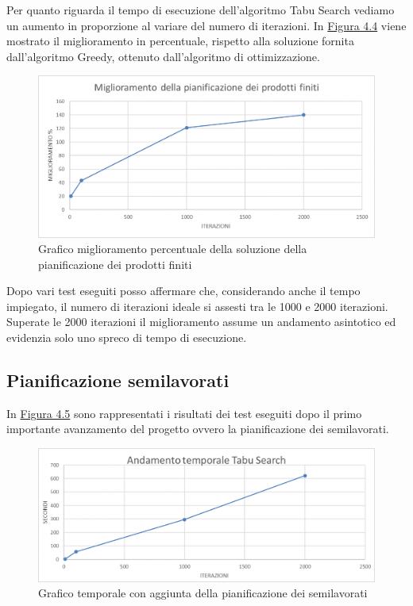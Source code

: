 Per quanto riguarda il tempo di esecuzione dell'algoritmo Tabu Search vediamo un aumento in proporzione al variare del numero di iterazioni.
In \hyperref[4.4]{Figura 4.4} viene mostrato il miglioramento in percentuale, rispetto alla soluzione fornita dall'algoritmo Greedy, ottenuto dall'algoritmo di ottimizzazione.

\begin{figure}[H]
	\includegraphics[width=13cm]{immagini/graficoPF3.png}
	\centering
    \caption{Grafico miglioramento percentuale della soluzione della pianificazione dei prodotti finiti}
    \label{4.4}
\end{figure}

Dopo vari test eseguiti posso affermare che, considerando anche il tempo impiegato, il numero di iterazioni ideale si assesti tra le 1000 e 2000 iterazioni.
Superate le 2000 iterazioni il miglioramento assume un andamento asintotico ed evidenzia solo uno spreco di tempo di esecuzione. 

\newpage
\subsection{Pianificazione semilavorati}

In \hyperref[4.5]{Figura 4.5} sono rappresentati i risultati dei test eseguiti dopo il primo importante avanzamento del progetto ovvero la pianificazione dei semilavorati.

\begin{figure}[H]
	\includegraphics[width=13cm]{immagini/graficosl2.png}
	\centering
    \caption{Grafico temporale con aggiunta della pianificazione dei semilavorati}
    \label{4.5}
\end{figure}

